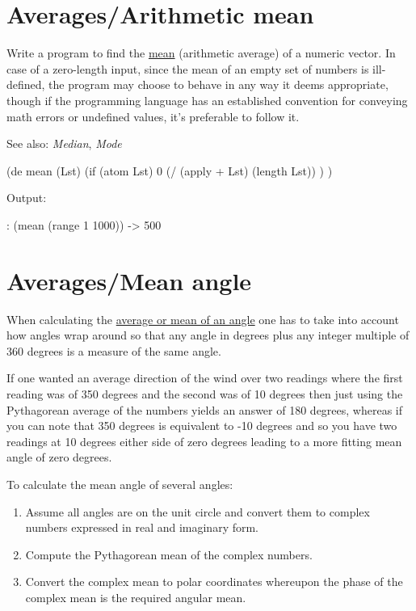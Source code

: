 \pagebreak{}
\section*{Averages/Arithmetic mean}

Write a program to find the
\href{http://en.wikipedia.org/wiki/arithmetic\_mean}{mean} (arithmetic
average) of a numeric vector. In case of a zero-length input, since
the mean of an empty set of numbers is ill-defined, the program may
choose to behave in any way it deems appropriate, though if the
programming language has an established convention for conveying math
errors or undefined values, it's preferable to follow it.

See also: \emph{Median}, \emph{Mode}

\begin{wideverbatim}

(de mean (Lst)
   (if (atom Lst)
      0
      (/ (apply + Lst) (length Lst)) ) )

Output:

: (mean (range 1 1000))
-> 500

\end{wideverbatim}


\pagebreak{}
\section*{Averages/Mean angle}

When calculating the
\href{http://en.wikipedia.org/wiki/Mean\_of\_circular\_quantities}{average
  or mean of an angle} one has to take into account how angles wrap
around so that any angle in degrees plus any integer multiple of 360
degrees is a measure of the same angle.

If one wanted an average direction of the wind over two readings where
the first reading was of 350 degrees and the second was of 10 degrees
then just using the Pythagorean average of the numbers yields an answer
of 180 degrees, whereas if you can note that 350 degrees is equivalent
to -10 degrees and so you have two readings at 10 degrees either side of
zero degrees leading to a more fitting mean angle of zero degrees.

To calculate the mean angle of several angles:

\begin{enumerate}
\item
  Assume all angles are on the unit circle and convert them to complex
  numbers expressed in real and imaginary form.
\item
  Compute the Pythagorean mean of the complex numbers.
\item
  Convert the complex mean to polar coordinates whereupon the phase of
  the complex mean is the required angular mean.
\end{enumerate}

